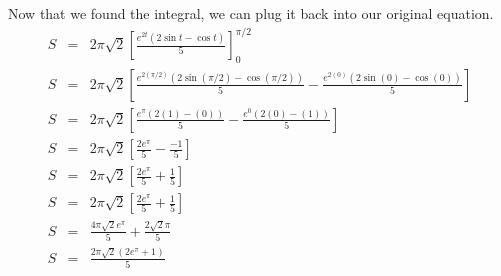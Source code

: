 \documentclass[11pt]{exam}
\begin{document}
Now that we found the integral, we can plug it back into our original equation.
\begin{eqnarray*}
	S &=& 2\pi\sqrt{2} \left[\frac{e^{2t}(2\sin t-\cos t)}{5}\right]_0^{\pi/2} \\	
	S &=& 2\pi\sqrt{2} \left[\frac{e^{2(\pi/2)}(2\sin (\pi/2)-\cos (\pi/2))}{5}-\frac{e^{2(0)}(2\sin (0)-\cos (0))}{5}\right] \\
	S &=& 2\pi\sqrt{2} \left[\frac{e^{\pi}(2(1)-(0))}{5}-\frac{{e^0}(2(0)-(1))}{5}\right] \\	
	S &=& 2\pi\sqrt{2} \left[\frac{2e^{\pi}}{5}-\frac{-1}{5}\right] \\
	S &=& 2\pi\sqrt{2} \left[\frac{2e^{\pi}}{5}+\frac{1}{5}\right] \\	
	S &=& 2\pi\sqrt{2} \left[\frac{2e^{\pi}}{5}+\frac{1}{5}\right] \\	
	S &=& \frac{4\pi\sqrt{2}e^\pi}{5} + \frac{2\sqrt{2}\pi}{5} \\
	S &=& \frac{2\pi\sqrt{2}(2e^\pi+1)}{5} \\	
\end{eqnarray*}
\end{document}
